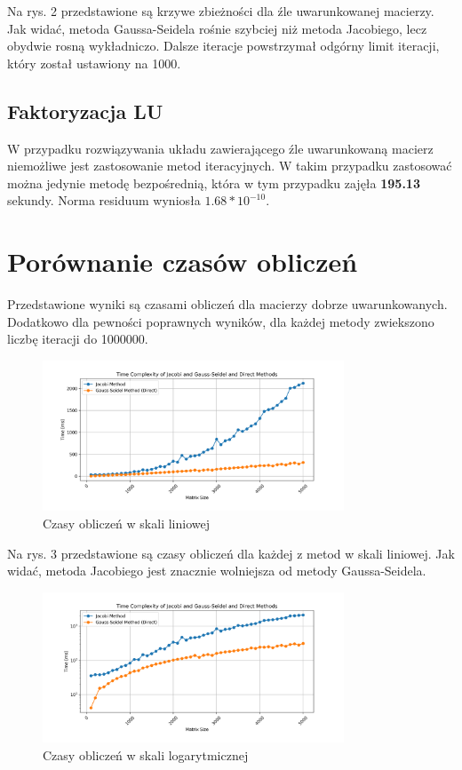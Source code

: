 \documentclass[a4paper,12pt]{article}  %
\begin{document}
Na rys. 2 przedstawione są krzywe zbieżności dla źle uwarunkowanej
macierzy. Jak widać, metoda Gaussa-Seidela rośnie szybciej niż metoda
Jacobiego, lecz obydwie rosną wykładniczo. Dalsze iteracje powstrzymał
odgórny limit iteracji, który został ustawiony na 1000.

\subsection{Faktoryzacja LU}
W przypadku rozwiązywania układu zawierającego źle uwarunkowaną macierz
niemożliwe jest zastosowanie metod iteracyjnych. W takim przypadku
zastosować można jedynie metodę bezpośrednią, która w tym przypadku
zajęła \textbf{195.13} sekundy. Norma residuum wyniosła \textbf{$1.68*10^{-10}$}.

\pagebreak
\section{Porównanie czasów obliczeń}
Przedstawione wyniki są czasami obliczeń dla macierzy dobrze
uwarunkowanych. Dodatkowo dla pewności poprawnych wyników, dla każdej
metody zwiekszono liczbę iteracji do 1000000.

\begin{figure}[H]
  \centering
  \includegraphics[width=0.8\textwidth]{./graphs/time_complexity_linear.png}
  \caption{Czasy obliczeń w skali liniowej}
\end{figure}

Na rys. 3 przedstawione są czasy obliczeń dla każdej z metod 
w skali liniowej. Jak widać, metoda Jacobiego jest znacznie wolniejsza
od metody Gaussa-Seidela.

\begin{figure}[H]
  \centering
  \includegraphics[width=0.8\textwidth]{./graphs/time_complexity.png}
  \caption{Czasy obliczeń w skali logarytmicznej}
\end{figure}
\end{document}
